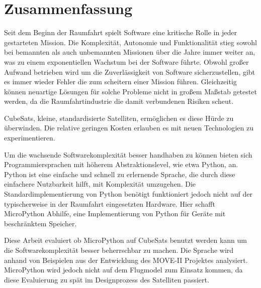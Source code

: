 \cleardoublepage
\section*{Zusammenfassung}

Seit dem Beginn der Raumfahrt spielt Software eine kritische Rolle in jeder gestarteten Mission. Die Komplexität, Autonomie und Funktionalität stieg sowohl bei bemannten als auch unbemannten Missionen über die Jahre immer weiter an, was zu einem exponentiellen Wachstum bei der Software führte.
Obwohl großer Aufwand betrieben wird um die Zuverlässigkeit von Software sicherzustellen, gibt es immer wieder Fehler die zum scheitern einer Mission führen. Gleichzeitig können neuartige Lösungen für solche Probleme nicht in großem Maßstab getestet werden, da die Raumfahrtindustrie die damit verbundenen Risiken scheut.

CubeSats, kleine, standardisierte Satelliten, ermöglichen es diese Hürde zu überwinden. Die relative geringen Kosten erlauben es mit neuen Technologien zu experimentieren.

Um die wachsende Softwarekomplexität besser handhaben zu können bieten sich Programmiersprachen mit höherem Abstraktionslevel, wie etwa Python, an. Python ist eine einfache und schnell zu erlernende Sprache, die durch diese einfachere Nutzbarkeit hilft, mit Komplexität umzugehen. Die Standardimplementierung von Python benötigt funktioniert jedoch nicht auf der typischerweise in der Raumfahrt eingesetzten Hardware. Hier schafft MicroPython Abhilfe, eine Implementierung von Python für Geräte mit beschränktem Speicher.

Diese Arbeit evaluiert ob MicroPython auf CubeSats benutzt werden kann um die Softwarekomplexität besser beherrschbar zu machen. Die Sprache wird anhand von Beispielen aus der Entwicklung des MOVE-II Projektes analysiert. MicroPython wird jedoch nicht auf dem Flugmodel zum Einsatz kommen, da diese Evaluierung zu spät im Designprozess des Satelliten passiert.

